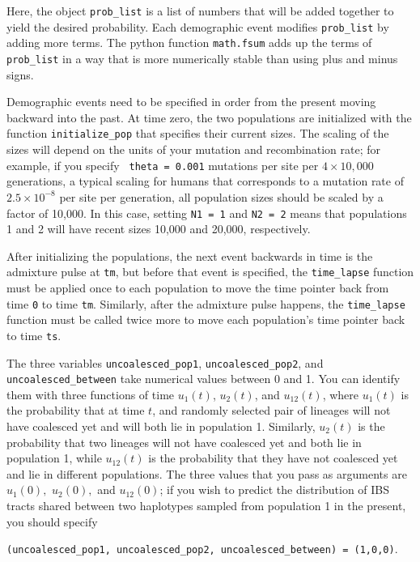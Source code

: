 \documentclass[12pt]{article}
\begin{document}
Here, the object \verb|prob_list| is a list of numbers that will be added together to yield the desired probability. Each demographic event modifies \verb|prob_list| by adding more terms. The python function \verb|math.fsum| adds up the terms of \verb|prob_list| in a way that is more numerically stable than using plus and minus signs.

Demographic events need to be specified in order from the present moving backward into the past. At time zero, the two populations are initialized with the function \verb|initialize_pop| that specifies their current sizes. The scaling of the sizes will depend on the units of your mutation and recombination rate; for example, if you specify \verb| theta = 0.001| mutations per site per $4\times 10,000$ generations, a typical scaling for humans that corresponds to a mutation rate of $2.5\times 10^{-8}$ per site per generation, all population sizes should be scaled by a factor of 10,000. In this case, setting \verb|N1 = 1| and \verb|N2 = 2| means that populations 1 and 2 will have recent sizes 10,000 and 20,000, respectively.

After initializing the populations, the next event backwards in time is the admixture pulse at \verb|tm|, but before that event is specified, the \verb|time_lapse| function must be applied once to each population to move the time pointer back from time \verb|0| to time \verb|tm|. Similarly, after the admixture pulse happens, the \verb|time_lapse| function must be called twice more to move each population's time pointer back to time \verb|ts|. 

The three variables \verb|uncoalesced_pop1|, \verb|uncoalesced_pop2|, and \verb|uncoalesced_between| take numerical values between 0 and 1. You can identify them with three functions of time $u_1(t)$, $u_2(t)$, and $u_{12}(t)$, where $u_1(t)$ is the probability that at time $t$, and randomly selected pair of lineages will not have coalesced yet and will both lie in population 1. Similarly, $u_2(t)$ is the probability that two lineages will not have coalesced yet and both lie in population 1, while $u_{12}(t)$ is the probability that they have not coalesced yet and lie in different populations. The three values that you pass as arguments are $u_1(0),$ $u_2(0),$ and $u_{12}(0)$; if you wish to predict the distribution of IBS tracts shared between two haplotypes sampled from population 1 in the present, you should specify 

\verb|(uncoalesced_pop1, uncoalesced_pop2, uncoalesced_between) = (1,0,0)|.
\end{document}
